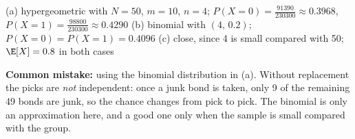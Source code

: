 \begin{solution}
	\begin{answer}
		(a) hypergeometric with $N=50$, $m=10$, $n=4$;
		$P(X=0)=\frac{91390}{230300}\approx0.3968$,
		$P(X=1)=\frac{98800}{230300}\approx0.4290$ \quad
		(b) binomial with $(4,\,0.2)$; $P(X=0)=P(X=1)=0.4096$ \quad
		(c) close, since 4 is small compared with 50; $\E[X]=0.8$ in both cases
	\end{answer}
	\begin{remark}
		\textbf{Common mistake:} using the binomial distribution in (a). Without
		replacement the picks are \emph{not} independent: once a junk bond is
		taken, only 9 of the remaining 49 bonds are junk, so the chance changes
		from pick to pick. The binomial is only an approximation here, and a
		good one only when the sample is small compared with the group.
	\end{remark}
\end{solution}

